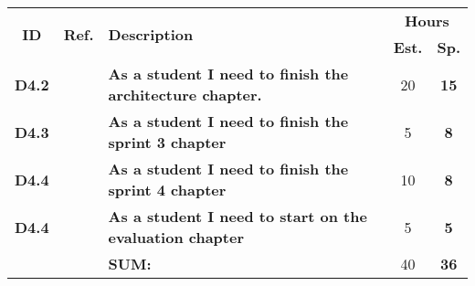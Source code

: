   \label{tab:sprint4Documentationstories}
 \def\arraystretch{1.25}
 
\begin{longtable}{ccXcc}

\toprule[0.5mm]
\multirow{2}{*}{\textbf{ID}} &
\multirow{2}{*}{\textbf{Ref.}} & \multirow{2}{*}{\textbf{Description}} & \multicolumn{2}{c}{\textbf{Hours}} \\
 					& & & \textbf{Est.} & \textbf{Sp.} \\
\midrule


\textbf{D4.2} 	&   & {\bf As a student I need to finish the architecture chapter.} 			& 	20  & \textbf{15} \\
	
\textbf{D4.3} 	&	& {\bf As a student I need to finish the sprint 3 chapter} 					&   5  	& \textbf{8} \\

\textbf{D4.4} 	&	& {\bf As a student I need to finish the sprint 4 chapter} 					& 	10 	& \textbf{8} \\

\textbf{D4.4} 	&	& {\bf As a student I need to start on the evaluation chapter} 				& 	5 	& \textbf{5} \\

\midrule
		
				&	& \textbf{SUM:}		&		40	& \textbf{36}
 \\																			
\bottomrule[0.5mm]
\end{longtable}
